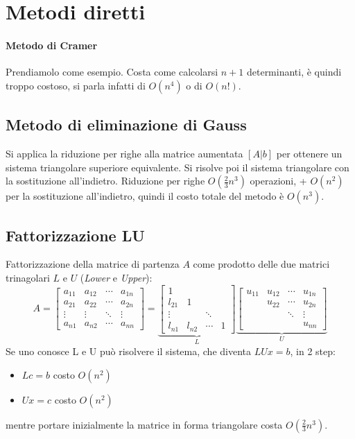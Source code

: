\documentclass[12pt,a4paper,]{report}
\begin{document}
\section{Metodi diretti}
\paragraph{Metodo di Cramer}
Prendiamolo come esempio.
Costa come calcolarsi $n+1$ determinanti, è quindi troppo costoso, si parla infatti di $O(n^4)$ o di $O(n!)$.
\subsection{Metodo di eliminazione di Gauss}
Si applica la riduzione per righe alla matrice aumentata $[A|b]$ per ottenere un sistema triangolare superiore equivalente.
Si risolve poi il sistema triangolare con la sostituzione all'indietro.
Riduzione per righe $O(\frac{2}{3}n^3)$ operazioni, + $O(n^2)$  per la sostituzione all'indietro, quindi il costo totale del metodo è $O(n^3)$.

\subsection{Fattorizzazione LU}
Fattorizzazione della matrice di partenza $A$ come prodotto delle due matrici trinagolari $L$ e $U$ (\textit{Lower} e \textit{Upper}):
\[
A = \begin{bmatrix}
a_{11} & a_{12} & \cdots & a_{1n} \\
a_{21} & a_{22} & \cdots & a_{2n} \\
\vdots & \vdots & \ddots & \vdots \\
a_{n1} & a_{n2} & \cdots & a_{nn}
\end{bmatrix}
=
\underbrace{\begin{bmatrix}
1 & & & \\
l_{21} & 1 & & \\
\vdots & & \ddots & \\
l_{n1} & l_{n2} & \cdots & 1
\end{bmatrix}}_{L}
\underbrace{\begin{bmatrix}
u_{11} & u_{12} & \cdots & u_{1n} \\
 & u_{22} & \cdots & u_{2n} \\
 & & \ddots & \vdots \\
 & & & u_{nn}
\end{bmatrix}}_{U}
\]
Se uno conosce L e U può risolvere il sistema, che diventa $LUx=b$, in 2 step:
\begin{itemize}
    \item $Lc=b$ costo $O(n^2)$
    \item $Ux=c$ costo $O(n^2)$
\end{itemize}
mentre portare inizialmente la matrice in forma triangolare costa $O(\frac{2}{3}n^3)$.
\end{document}
